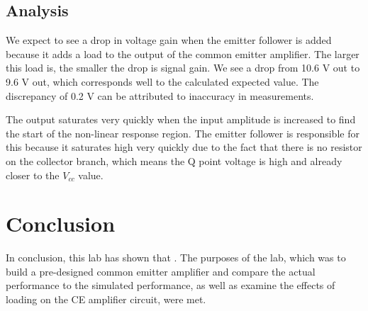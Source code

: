 \documentclass[12pt,letterpaper]{report}
\begin{document}
\subsection*{Analysis}

We expect to see a drop in voltage gain when the emitter follower is added because it adds a load to the output of the common emitter amplifier. The larger this load is, the smaller the drop is signal gain. We see a drop from 10.6 V out to 9.6 V out, which corresponds well to the calculated expected value. The discrepancy of 0.2 V can be attributed to inaccuracy in measurements.

The output saturates very quickly when the input amplitude is increased to find the start of the non-linear response region. The emitter follower is responsible for this because it saturates high very quickly due to the fact that there is no resistor on the collector branch, which means the Q point voltage is high and already closer to the $V_{cc}$ value.

\section*{Conclusion}

In conclusion, this lab has shown that 
. The purposes of the lab, which was to build a pre-designed common emitter amplifier and compare the actual performance to the simulated performance, as well as  examine the effects of loading on the CE amplifier circuit, were met.
\end{document}
